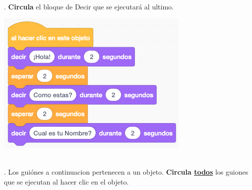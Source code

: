 \documentclass[letterpaper,12pt]{article}
\begin{document}
\noindent \dotfill \\

. \textbf{Circula} el bloque de Decir que se ejecutará al ultimo.  \\
\begin{center}
\includegraphics[scale=.5]{q2_script0.png}
\end{center}

\noindent \dotfill \\

. Los guiónes a continuacion pertenecen a un objeto. \textbf{Circula \underline{todos}} los guiones que se ejecutan al hacer clic en el objeto. \\
\end{document}
